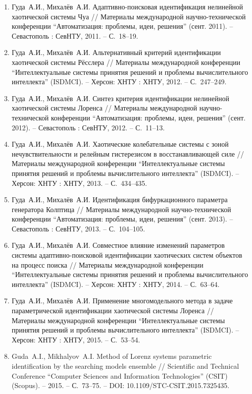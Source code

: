 \begin{enumerate}
\item
Гуда~А.И., Михалёв~А.И. Адаптивно-поисковая идентификация нелинейной хаотической системы Чуа
// Материалы международной научно-технической конференции
``Автоматизация: проблемы, идеи, решения'' (сент. 2011). -- Севастополь : СевНТУ,
2011. -- С.~18--19.

\item
Гуда~А.И., Михалёв~А.И. Альтернативный критерий идентификации хаотической системы Рёсслера
 // Материалы международной конференции
``Интеллектуальные системы принятия решений и проблемы вычислительного интеллекта'' (ISDMCI). --
Херсон: ХНТУ : ХНТУ, 2012. -- С.~247--249.

\item
Гуда~А.И., Михалёв~А.И. Синтез критерия идентификации нелинейной хаотической
системы Лоренса // Материалы международной научно-технической конференции
``Автоматизация: проблемы, идеи, решения'' (сент. 2012). -- Севастополь : СевНТУ,
2012. -- С.~11--13.

\item
Гуда~А.И., Михалёв~А.И. Хаотические колебательные системы с зоной нечувствительности
 и релейным гистерезисом в восстанавливающей силе
// Материалы международной конференции ``Интеллектуальные системы принятия решений и проблемы
вычислительного интеллекта'' (ISDMCI). -- Херсон: ХНТУ : ХНТУ, 2013. -- С.~434--435.

\item
Гуда~А.И., Михалёв~А.И. Идентификация бифуркационного параметра генератора
Колптица // Материалы международной научно-технической конференции
 ``Автоматизация: проблемы, идеи, решения'' (сент. 2013). -- Севастополь : СевНТУ, 2013. -- С.~104--105.

\item
Гуда~А.И., Михалёв~А.И. Совместное влияние изменений параметров системы
адаптивно-поисковой идентификации хаотических систем объектов на процесс поиска
// Материалы международной конференции
``Интеллектуальные системы принятия решений и проблемы вычислительного интеллекта'' (ISDMCI).
 -- Херсон: ХНТУ : ХНТУ, 2014. -- С.~63--64.

\item
Гуда~А.И., Михалёв~А.И. Применение многомодельного метода в задаче параметрической
идентификации хаотической системы Лоренса // Материалы международной
конференции ``Интеллектуальные системы принятия решений и проблемы вычислительного интеллекта'' (ISDMCI).
 -- Херсон: ХНТУ : ХНТУ, 2015. -- С.~53--54.

\item
Guda~A.I., Mikhalyov~A.I. Method of Lorenz systems parametric identification by the
searching models ensemble // Scientific and Technical Conference ``Computer Sciences and
Information Technologies'' (CSIT) (Scopus). -- 2015. -- С.~73--75. -- DOI: 10.1109/STC-CSIT.2015.7325435.


\end{enumerate}
